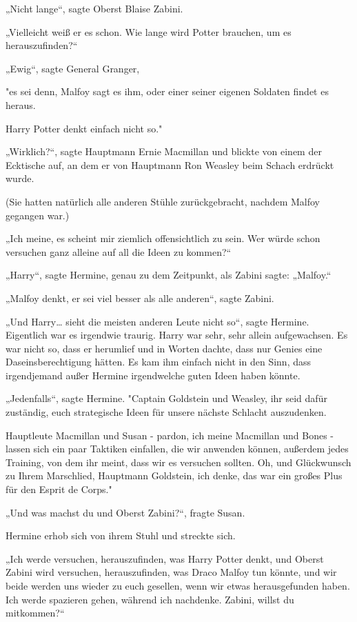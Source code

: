 {„Nicht lange“, sagte Oberst Blaise Zabini.

„Vielleicht weiß er es schon. Wie lange wird Potter brauchen, um es herauszufinden?“

„Ewig“, sagte General Granger,

"es sei denn, Malfoy sagt es ihm, oder einer seiner eigenen Soldaten findet es heraus.

Harry Potter denkt einfach nicht so."

„Wirklich?“, sagte Hauptmann Ernie Macmillan und blickte von einem der Ecktische auf, an dem er von Hauptmann Ron Weasley beim Schach erdrückt wurde.

(Sie hatten natürlich alle anderen Stühle zurückgebracht, nachdem Malfoy gegangen war.)

„Ich meine, es scheint mir ziemlich offensichtlich zu sein. Wer würde schon versuchen ganz alleine auf all die Ideen zu kommen?“

„Harry“, sagte Hermine, genau zu dem Zeitpunkt, als Zabini sagte: „Malfoy.“

„Malfoy denkt, er sei viel besser als alle anderen“, sagte Zabini.

„Und Harry… sieht die meisten anderen Leute nicht so“, sagte Hermine. Eigentlich war es irgendwie traurig. Harry war sehr, sehr allein aufgewachsen. Es war nicht so, dass er herumlief und in Worten dachte, dass nur Genies eine Daseinsberechtigung hätten. Es kam ihm einfach nicht in den Sinn, dass irgendjemand außer Hermine irgendwelche guten Ideen haben könnte.

„Jedenfalls“, sagte Hermine. "Captain Goldstein und Weasley, ihr seid dafür zuständig, euch strategische Ideen für unsere nächste Schlacht auszudenken.

Hauptleute Macmillan und Susan - pardon, ich meine Macmillan und Bones - lassen sich ein paar Taktiken einfallen, die wir anwenden können, außerdem jedes Training, von dem ihr meint, dass wir es versuchen sollten. Oh, und Glückwunsch zu Ihrem Marschlied, Hauptmann Goldstein, ich denke, das war ein großes Plus für den Esprit de Corps."

„Und was machst du und Oberst Zabini?“, fragte Susan.

Hermine erhob sich von ihrem Stuhl und streckte sich.

„Ich werde versuchen, herauszufinden, was Harry Potter denkt, und Oberst Zabini wird versuchen, herauszufinden, was Draco Malfoy tun könnte, und wir beide werden uns wieder zu euch gesellen, wenn wir etwas herausgefunden haben. Ich werde spazieren gehen, während ich nachdenke. Zabini, willst du mitkommen?“

}

